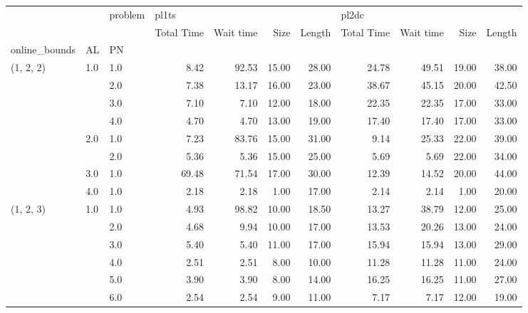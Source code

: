 \begin{tabular}{lllrrrrrrrr}
\toprule
          &     & problem & \multicolumn{4}{l}{pl1ts} & \multicolumn{4}{l}{pl2dc} \\
          &     & {} & Total Time & Wait time &  Size & Length & Total Time & Wait time &  Size & Length \\
online\_bounds & AL & PN &            &           &       &        &            &           &       &        \\
\midrule
(1, 2, 2) & 1.0 & 1.0  &       8.42 &     92.53 & 15.00 &  28.00 &      24.78 &     49.51 & 19.00 &  38.00 \\
          &     & 2.0  &       7.38 &     13.17 & 16.00 &  23.00 &      38.67 &     45.15 & 20.00 &  42.50 \\
          &     & 3.0  &       7.10 &      7.10 & 12.00 &  18.00 &      22.35 &     22.35 & 17.00 &  33.00 \\
          &     & 4.0  &       4.70 &      4.70 & 13.00 &  19.00 &      17.40 &     17.40 & 17.00 &  33.00 \\
          & 2.0 & 1.0  &       7.23 &     83.76 & 15.00 &  31.00 &       9.14 &     25.33 & 22.00 &  39.00 \\
          &     & 2.0  &       5.36 &      5.36 & 15.00 &  25.00 &       5.69 &      5.69 & 22.00 &  34.00 \\
          & 3.0 & 1.0  &      69.48 &     71.54 & 17.00 &  30.00 &      12.39 &     14.52 & 20.00 &  44.00 \\
          & 4.0 & 1.0  &       2.18 &      2.18 &  1.00 &  17.00 &       2.14 &      2.14 &  1.00 &  20.00 \\
(1, 2, 3) & 1.0 & 1.0  &       4.93 &     98.82 & 10.00 &  18.50 &      13.27 &     38.79 & 12.00 &  25.00 \\
          &     & 2.0  &       4.68 &      9.94 & 10.00 &  17.00 &      13.53 &     20.26 & 13.00 &  24.00 \\
          &     & 3.0  &       5.40 &      5.40 & 11.00 &  17.00 &      15.94 &     15.94 & 13.00 &  29.00 \\
          &     & 4.0  &       2.51 &      2.51 &  8.00 &  10.00 &      11.28 &     11.28 & 11.00 &  24.00 \\
          &     & 5.0  &       3.90 &      3.90 &  8.00 &  14.00 &      16.25 &     16.25 & 11.00 &  27.00 \\
          &     & 6.0  &       2.54 &      2.54 &  9.00 &  11.00 &       7.17 &      7.17 & 12.00 &  19.00 \\

\end{tabular}
